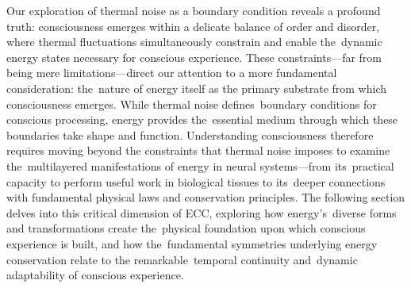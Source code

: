 Our exploration of thermal noise as a boundary condition reveals a profound truth: consciousness emerges within a delicate balance of order and disorder, where thermal fluctuations simultaneously constrain and enable the~dynamic energy states necessary for conscious experience. These constraints—far from being mere limitations—direct our attention to a more fundamental consideration: the~nature of energy itself as the primary substrate from which consciousness emerges. While thermal noise defines~boundary conditions for conscious processing, energy provides the~essential medium through which these boundaries take shape and function. Understanding consciousness therefore requires moving beyond the constraints that thermal noise imposes to examine the~multilayered manifestations of energy in neural systems—from its~practical capacity to perform useful work in biological tissues to its~deeper connections with fundamental physical laws and conservation principles. The following section delves into this critical dimension of ECC, exploring how energy's~diverse forms and transformations create the~physical foundation upon which conscious experience is built, and how the~fundamental symmetries underlying energy conservation relate to the remarkable~temporal continuity and~dynamic adaptability of conscious experience.
